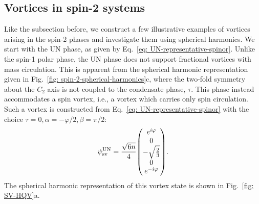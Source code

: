 \subsection{Vortices in spin-2 systems}\label{sec: vortices-spin-2}
Like the subsection before, we construct a few illustrative examples of vortices
arising in the spin-2 phases and investigate them using spherical harmonics.
We start with the UN phase, as given by
Eq.~\eqref{eq: UN-representative-spinor}.
Unlike the spin-1 polar phase, the UN phase does not support fractional vortices
with mass circulation.
This is apparent from the spherical harmonic representation given in
Fig.~\ref{fig: spin-2-spherical-harmonics}c, where the two-fold symmetry
about the \(C_2\) axis is not coupled to the condensate phase, \(\tau \).
This phase instead accommodates a spin vortex, i.e., a vortex which carries only
spin circulation.
Such a vortex is constructed from Eq.~\eqref{eq: UN-representative-spinor} with
the choice \(\tau=0, \alpha=-\varphi/2, \beta=\pi/2\):
\begin{equation}
    \psi^\text{UN}_\text{sv} = \frac{\sqrt{6n}}{4}\mqty(
    e^{i\varphi} \\
    0 \\
    -\sqrt{\frac{2}{3}} \\
    0 \\ e^{-i\varphi}
    ).
\end{equation}
The spherical harmonic representation of this vortex state is shown in
Fig.~\ref{fig: SV-HQV}a.
